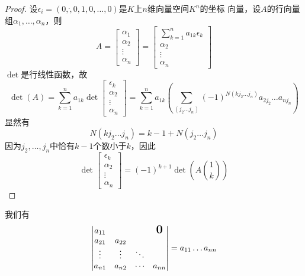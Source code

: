 \documentclass[11pt]{article}
\begin{document}
\begin{proof}
设\(\epsilon_i=(0,\dot,0,1,0,\dots,0)\)是\(K\)上\(n\)维向量空间\(K^n\)的坐标
向量，设\(A\)的行向量组\(\alpha_1,\dots,\alpha_n\)，则
\begin{equation*}
A=
\begin{bmatrix}
\alpha_1\\\alpha_2\\\vdots\\\alpha_n
\end{bmatrix}=
\begin{bmatrix}
\sum_{k=1}^na_{1k}\epsilon_k\\\alpha_2\\\vdots\\\alpha_n
\end{bmatrix}
\end{equation*}
\(\det\)是行线性函数，故
\begin{equation*}
\det(A)=\sum_{k=1}^na_{1k}\det
\begin{bmatrix}
\epsilon_k\\\alpha_2\\\vdots\\\alpha_n
\end{bmatrix}=
\sum_{k=1}^na_{1k}\left(
\sum_{(j_2\dots j_n)}(-1)^{N(kj_2\dots j_n)}a_{2j_2}\dots a_{nj_n}
\right)
\end{equation*}
显然有
\begin{equation*}
N(kj_2\dots j_n)=k-1+N(j_2\dots j_n)
\end{equation*}
因为\(j_2,\dots,j_n\)中恰有\(k-1\)个数小于\(k\)，因此
\begin{equation*}
\det
\begin{bmatrix}
\epsilon_k\\\alpha_2\\\vdots\\\alpha_n
\end{bmatrix}=(-1)^{k+1}\det(A\binom{1}{k})
\end{equation*}
\end{proof}

\begin{proposition}[]
我们有
\begin{equation*}
\begin{vmatrix}
a_{11}&&&\mbox{\normalfont\Large\bfseries 0}\\
a_{21}&a_{22}&&\\
\vdots&\vdots&\ddots&\\
a_{n1}&a_{n2}&\cdots&a_{nn}
\end{vmatrix}=
a_{11}\dots a_{nn}
\end{equation*}
\end{proposition}
\end{document}
